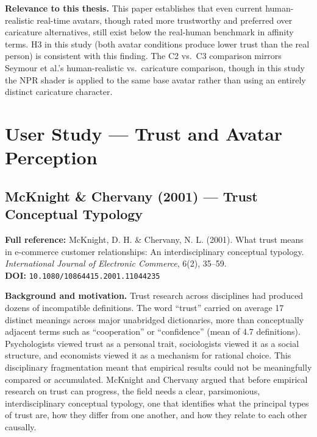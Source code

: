 \documentclass[11pt, a4paper]{article}
\begin{document}
\textbf{Relevance to this thesis.} This paper establishes that even current human-realistic real-time avatars, though rated more trustworthy and preferred over caricature alternatives, still exist below the real-human benchmark in affinity terms. H3 in this study (both avatar conditions produce lower trust than the real person) is consistent with this finding. The C2 vs.\ C3 comparison mirrors Seymour et al.'s human-realistic vs.\ caricature comparison, though in this study the NPR shader is applied to the same base avatar rather than using an entirely distinct caricature character.

\newpage
\section{User Study --- Trust and Avatar Perception}

\subsection{McKnight \& Chervany (2001) --- Trust Conceptual Typology}

\begin{refbox}
\textbf{Full reference:} McKnight, D. H. \& Chervany, N. L. (2001). What trust means in e-commerce customer relationships: An interdisciplinary conceptual typology. \textit{International Journal of Electronic Commerce}, 6(2), 35--59.\\[4pt]
\textbf{DOI:} \texttt{10.1080/10864415.2001.11044235}
\end{refbox}

\textbf{Background and motivation.} Trust research across disciplines had produced dozens of incompatible definitions. The word ``trust'' carried on average 17 distinct meanings across major unabridged dictionaries, more than conceptually adjacent terms such as ``cooperation'' or ``confidence'' (mean of 4.7 definitions). Psychologists viewed trust as a personal trait, sociologists viewed it as a social structure, and economists viewed it as a mechanism for rational choice. This disciplinary fragmentation meant that empirical results could not be meaningfully compared or accumulated. McKnight and Chervany argued that before empirical research on trust can progress, the field needs a clear, parsimonious, interdisciplinary conceptual typology, one that identifies what the principal types of trust are, how they differ from one another, and how they relate to each other causally.
\end{document}
